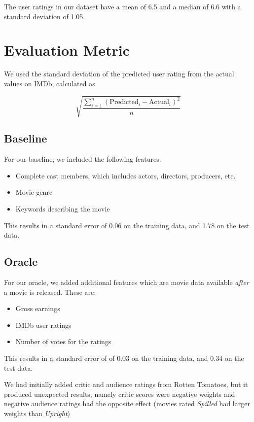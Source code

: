 \documentclass[journal]{IEEEtran}
\begin{document}

The user ratings in our dataset have a mean of 6.5 and a median of 6.6 with a standard deviation of 1.05.

\section{Evaluation Metric}
We used the standard deviation of the predicted user rating from the actual values on IMDb, calculated as

$$ \sqrt{\frac{\sum_{i=1}^n(\text{Predicted}_i-\text{Actual}_i)^2}{n}} $$

\subsection{Baseline}
For our baseline, we included the following features:
\\
\begin{itemize}
	\item Complete cast members, which includes actors, directors, producers, etc.
	\item Movie genre
	\item Keywords describing the movie
\end{itemize}
\bigskip

\par This results in a standard error of 0.06 on the training data, and
1.78 on the test data.

\subsection{Oracle}
For our oracle, we added additional features which are movie data available
\emph{after} a movie is released. These are:
\\
\begin{itemize}
	\item Gross earnings
	\item IMDb user ratings
	\item Number of votes for the ratings
\end{itemize}
\bigskip
\par This results in a standard error of of 0.03 on the training data, and 0.34 on the test data.
\\
\par We had initially added critic and audience ratings from Rotten Tomatoes, but it produced unexpected results, namely critic scores were negative weights and negative audience ratings had the opposite effect (movies rated \emph{Spilled} had larger weights than \emph{Upright})
\end{document}

